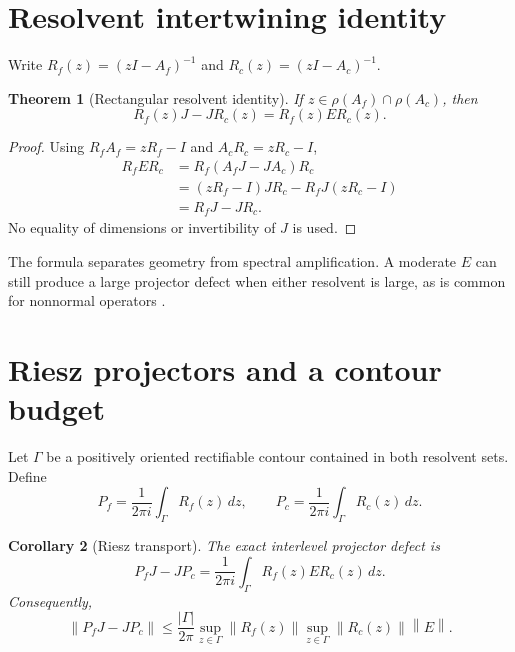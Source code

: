 \documentclass[12pt]{article}
\newtheorem{theorem}{Theorem}[section]
\newtheorem{corollary}[theorem]{Corollary}
\theoremstyle{remark}\newtheorem{remark}[theorem]{Remark}
\newcommand{\norm}[1]{\left\lVert#1\right\rVert}
\begin{document}
\section{Resolvent intertwining identity}

Write $R_f(z)=(zI-A_f)^{-1}$ and $R_c(z)=(zI-A_c)^{-1}$.

\begin{theorem}[Rectangular resolvent identity]\label{thm:resolvent}
If $z\in\rho(A_f)\cap\rho(A_c)$, then
\begin{equation}\label{eq:resolvent}
 R_f(z)J-JR_c(z)=R_f(z)ER_c(z).
\end{equation}
\end{theorem}

\begin{proof}
Using $R_fA_f=zR_f-I$ and $A_cR_c=zR_c-I$,
\begin{align*}
 R_fER_c
 &=R_f(A_fJ-JA_c)R_c\\
 &=(zR_f-I)JR_c-R_fJ(zR_c-I)\\
 &=R_fJ-JR_c.
\end{align*}
No equality of dimensions or invertibility of $J$ is used.
\end{proof}

The formula separates geometry from spectral amplification.  A moderate
$E$ can still produce a large projector defect when either resolvent is
large, as is common for nonnormal operators \citep{TrefethenEmbree2005}.

\section{Riesz projectors and a contour budget}

Let $\Gamma$ be a positively oriented rectifiable contour contained in both
resolvent sets.  Define
\begin{equation}\label{eq:riesz}
 P_f=\frac{1}{2\pi i}\int_\Gamma R_f(z)\,dz,
 \qquad
 P_c=\frac{1}{2\pi i}\int_\Gamma R_c(z)\,dz.
\end{equation}

\begin{corollary}[Riesz transport]\label{cor:riesz}
The exact interlevel projector defect is
\begin{equation}\label{eq:projector-identity}
 P_fJ-JP_c
 =\frac{1}{2\pi i}\int_\Gamma R_f(z)ER_c(z)\,dz.
\end{equation}
Consequently,
\begin{equation}\label{eq:projector-bound}
 \norm{P_fJ-JP_c}
 \le \frac{|\Gamma|}{2\pi}
 \sup_{z\in\Gamma}\norm{R_f(z)}
 \sup_{z\in\Gamma}\norm{R_c(z)}\norm E.
\end{equation}
\end{corollary}
\end{document}
